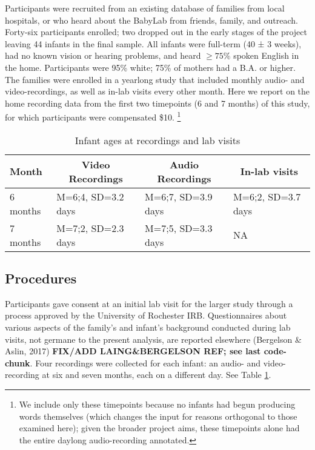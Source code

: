 \documentclass[floatsintext,man]{apa6}
\theoremstyle{definition}
\theoremstyle{definition}
\theoremstyle{definition}
\theoremstyle{remark}
\begin{document}
Participants were recruited from an existing database of families from
local hospitals, or who heard about the BabyLab from friends, family,
and outreach. Forty-six participants enrolled; two dropped out in the
early stages of the project leaving 44 infants in the final sample. All
infants were full-term (40 ± 3 weeks), had no known vision or hearing
problems, and heard \(\geq 75\%\) spoken English in the home.
Participants were 95\% white; 75\% of mothers had a B.A. or higher. The
families were enrolled in a yearlong study that included monthly audio-
and video-recordings, as well as in-lab visits every other month. Here
we report on the home recording data from the first two timepoints (6
and 7 months) of this study, for which participants were compensated
\$10.
\footnote{We include only these timepoints because no infants had begun producing words themselves (which changes the input for reasons orthogonal to those examined here); given the broader project aims, these timepoints alone had the entire daylong audio-recording annotated.}

\begin{table}[tbp]
\begin{center}
\begin{threeparttable}
\caption{\label{tab:recording-ages-table}Infant ages at recordings and lab visits}
\begin{tabular}{llll}
\toprule
Month & \multicolumn{1}{c}{Video Recordings} & \multicolumn{1}{c}{Audio Recordings} & \multicolumn{1}{c}{In-lab visits}\\
\midrule
6 months & M=6;4, SD=3.2 days & M=6;7, SD=3.9 days & M=6;2, SD=3.7 days\\
7 months & M=7;2, SD=2.3 days & M=7;5, SD=3.3 days & NA\\
\bottomrule
\end{tabular}
\end{threeparttable}
\end{center}
\end{table}

\subsection{Procedures}\label{procedures}

Participants gave consent at an initial lab visit for the larger study
through a process approved by the University of Rochester IRB.
Questionnaires about various aspects of the family's and infant's
background conducted during lab visits, not germane to the present
analysis, are reported elsewhere (Bergelson \& Aslin, 2017)
\textbf{FIX/ADD LAING\&BERGELSON REF; see last code-chunk}. Four
recordings were collected for each infant: an audio- and video-recording
at six and seven months, each on a different day. See Table
\ref{tab:recording-ages-table}.
\end{document}
